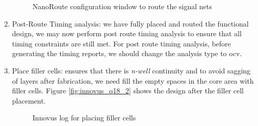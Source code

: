 \documentclass[a4paper,11pt]{article}%
\begin{document}
\begin{enumerate}[1.)]
	\begin{figure}[H]
		\centering
		\caption{NanoRoute configuration window to route the signal nets}
		\label{fig:innovus_q16_2}
	\end{figure}
	
	\item  Post-Route Timing analysis: we have fully placed and routed the functional design, we may now perform post route timing analysis to ensure that all timing constraints are still met. For post route timing analysis, before generating the timing reports, we should change the analysis type to \ac{ocv}.
	
	\item Place filler cells: ensures that there is \textit{n-well} continuity and to avoid sagging of layers after fabrication, we need fill the empty spaces in the core area with filler cells. Figure \ref{fig:innovus_q18_2} shows the design after the filler cell placement.
	\begin{figure}[H]
		\centering
		\caption{Innovus log for placing filler cells}
		\label{fig:addFiller}
	\end{figure}
	

\end{enumerate}
\end{document}
